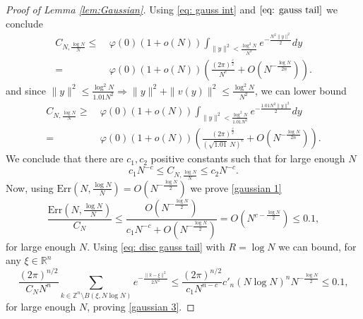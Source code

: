 \documentclass[11pt,letterpaper]{amsart}
\theoremstyle{definition}
\theoremstyle{plain}
\newcommand{\R}{{\mathbb R}}
\newcommand{\Z}{{\mathbb Z}}
\begin{document}
\begin{proof}[Proof of Lemma \ref{lem:Gaussian}]
Using \eqref{eq: gauss int} and $\eqref{eq: gauss tail}$ we conclude
\begin{align*}
  C_{N,\frac{\log N}{N}}
\le & \ \varphi(0)(1+o(N))\int_{\|y\|^2<\frac{\log^2 N}{N^2}}e^{-\frac{N^2\|y\|^2}{2}}dy\\
= & \ \varphi(0)(1+o(N))\left(\frac{(2\pi)^{\frac{c}{2}}}{N^c}+O(N^{-\frac{\log N}{2n}})\right).  
\end{align*}
and since $\|y\|^2\le \frac{\log^2 N}{1.01N^2}\Rightarrow \|y\|^2+\|v(y)\|^2\le \frac{\log^2 N}{N^2}$, we can lower bound
\begin{align*}
  C_{N,\frac{\log N}{N}}
\ge & \ \varphi(0)(1+o(N))\int_{\|y\|^2<\frac{\log^2 N}{1.01 N^2}}e^{-\frac{1.01 N^2\|y\|^2}{2}}dy\\
= &\ \varphi(0)(1+o(N))(\frac{(2\pi)^{\frac{c}{2}}}{({\sqrt{1.01}}\  N)^c}+O(N^{-\frac{\log N}{2n}})).  
\end{align*}
We conclude that there are $c_1,c_2$ positive constants such that for large enough $N$
\[c_1 N^{-c}\le C_{N,\frac{\log N}{N}}\le c_2 N^{-c}.\]	Now, using $\mathrm{Err}(N,\frac{\log N}{N})=O(N^{-\frac{\log N}{2}})$ we prove \eqref{gaussian 1}  
\[\frac{\mathrm{Err}(N,\frac{\log N}{N})}{C_{N}}\le  \frac{O(N^{-\frac{\log N}{2}})}{c_1 N^{-c}+O(N^{-\frac{\log N}{2}})}=O(N^{{ c}-\frac{\log N}{2}})\le 0.1,\]
for large enough $N$. Using \eqref{eq: disc gauss tail} with $R=\log N$ we can bound, for any $\xi\in\R^n$ 
\begin{equation*}
    \frac{(2\pi)^{n/2}}{C_{N}N^{n}}\sum_{k\in\Z^n\setminus B(\xi,N\log N)}e^{-\tfrac{\|k-\xi\|^2}{2N^2}}\leq \frac{(2\pi)^{n/2}}{c_{1}N^{n-c}} c'_n (N\log N)^n N^{-\frac{\log N}{2}}\le 0.1,
\end{equation*}
for large enough $N$, proving \eqref{gaussian 3}.
\end{proof}





 
\end{document}
